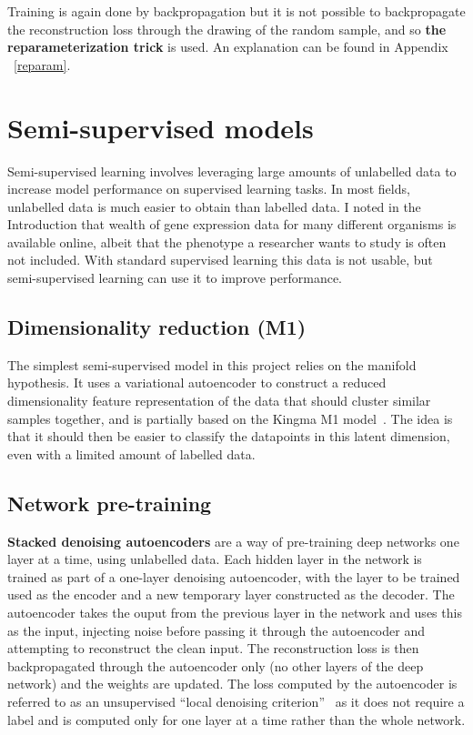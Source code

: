 Training is again done by backpropagation but
it is not possible to backpropagate the reconstruction loss through the drawing of the random sample, and so 
\textbf{the reparameterization trick} is used. 
An explanation can be found in Appendix ~\ref{reparam}.

\section{Semi-supervised models} \label{ss_models}

Semi-supervised learning involves leveraging large amounts of unlabelled data to increase model performance on supervised learning tasks. 
In most fields, unlabelled data is much easier to obtain than labelled data. I noted in the Introduction that wealth of gene 
expression data for many different organisms is available online, albeit that the phenotype a researcher wants 
to study is often not included. With standard supervised learning this data is not usable, but semi-supervised learning
can use it to improve performance. 

\subsection{Dimensionality reduction (M1)} \label{m1}

The simplest semi-supervised model in this project relies on the manifold hypothesis. It uses a variational autoencoder to construct a
reduced dimensionality feature representation of the data that should cluster similar samples together, and is partially based 
on the Kingma M1 model~\cite{DBLP:journals/corr/KingmaRMW14}. The idea is that it should then be 
easier to classify the datapoints in this latent dimension, even with a limited amount of labelled data.

\subsection{Network pre-training} \label{sdae}

\textbf{Stacked denoising autoencoders} are a way of pre-training deep networks one layer at a time, using unlabelled data. 
Each hidden layer in the network is 
trained as part of a one-layer denoising autoencoder, with the layer to be trained used as the encoder and a new temporary layer constructed
as the decoder. The autoencoder takes the ouput from the previous layer in the network and uses this as the input, injecting noise before 
passing it through the autoencoder and attempting to reconstruct the clean input. The reconstruction loss is then backpropagated through 
the autoencoder only (no other layers of the deep network) and the weights are updated. The loss computed by the autoencoder is referred to 
as an unsupervised ``local denoising criterion''~\cite{Vincent:2010:SDA:1756006.1953039} as it does not require a label and is computed only 
for one layer at a time rather than the whole network.

